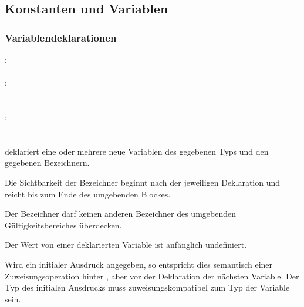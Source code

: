 \subsection{Konstanten und Variablen}\label{Konstanten und Variablen}
\subsubsection{Variablendeklarationen}\label{Variablendeklarationen}
:\label{dekl_var}\\
\hspace*{1cm}   \\
:\label{dekl_var_bzch_init_liste}\\
\hspace*{1cm} \\
\hspace*{1cm} \glq\Gt{,}\grq  {} \\
:\label{dekl_var_bzch_init}\\
\hspace*{1cm} \\
\hspace*{1cm} \glq\Gt{=}\grq  {} \\

 deklariert eine oder mehrere neue Variablen des gegebenen Typs und den gegebenen Bezeichnern.

Die Sichtbarkeit der Bezeichner beginnt nach der jeweiligen Deklaration
und reicht bis zum Ende des umgebenden Blockes.

Der Bezeichner darf keinen anderen Bezeichner des umgebenden Gültigkeitsbereiches überdecken.

Der Wert von einer deklarierten Variable ist anfänglich undefiniert.

Wird ein initialer Ausdruck angegeben, so entspricht dies semantisch einer Zuweisungsoperation
hinter , aber vor der Deklaration der nächsten Variable.
Der Typ des initialen Ausdrucks muss zuweisungskompatibel zum Typ der Variable sein.

